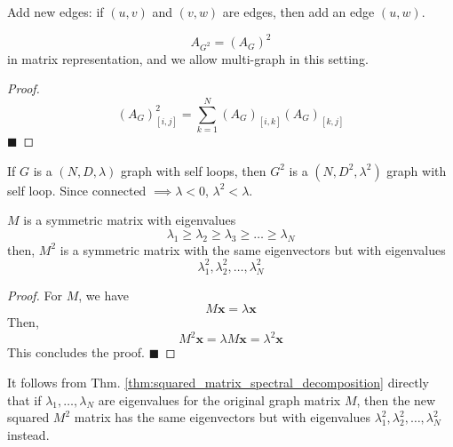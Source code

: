 \documentclass[11pt, letter]{book}
\newcommand{\bx}{\mathbf{x}}
\newcommand{\qed}{\hfill $\blacksquare$}
\begin{document}
\begin{definition}
	Add new edges: if $(u, v)$ and $(v, w)$ are edges, then add an edge $(u, w)$. 
\end{definition}

\begin{proposition}
	\begin{equation}
		A_{G^2} = ( A_G ) ^ 2
	\end{equation}
	in matrix representation, and we allow multi-graph in this setting. 
\end{proposition}

\begin{proof}
	\begin{equation}
		(A_G)^2_{[i, j]} = \sum_{k = 1}^N (A_{G})_{[i, k]} (A_{G})_{[k, j]}
	\end{equation}
	\qed
\end{proof}

\begin{proposition}
	If $G$ is a $(N, D, \lambda)$ graph with self loops, then $G^2$ is a $(N, D^2, \lambda^2)$ graph with self loop. Since connected $\implies \lambda < 0$, $\lambda^2 < \lambda$.
\end{proposition}

\begin{theorem}
	\label{thm:squared_matrix_spectral_decomposition}
	$M$ is a symmetric matrix with eigenvalues
	\begin{equation}
		\lambda_1 \geq \lambda_2 \geq \lambda_3 \geq \dots \geq \lambda_N
	\end{equation}
	then, $M^2$ is a symmetric matrix with the same eigenvectors but with eigenvalues
	\begin{equation}
		\lambda_1^2, \lambda_2^2, \dots, \lambda_N^2 
	\end{equation}
\end{theorem}

\begin{proof}
	For $M$, we have
	\begin{equation}
		M\bx = \lambda \bx
	\end{equation}
	Then, 
	\begin{equation}
		M^2 \bx = \lambda M\bx = \lambda^2 \bx
	\end{equation}
	This concludes the proof. \qed
\end{proof}

\begin{corollary}
	It follows from Thm. \ref{thm:squared_matrix_spectral_decomposition} directly that if $\lambda_1, \dots, \lambda_N$ are eigenvalues for the original graph matrix $M$, then the new squared $M^2$ matrix has the same eigenvectors but with eigenvalues $\lambda_1^2, \lambda_2^2, \dots, \lambda_N^2 $ instead. 
\end{corollary}
\end{document}
